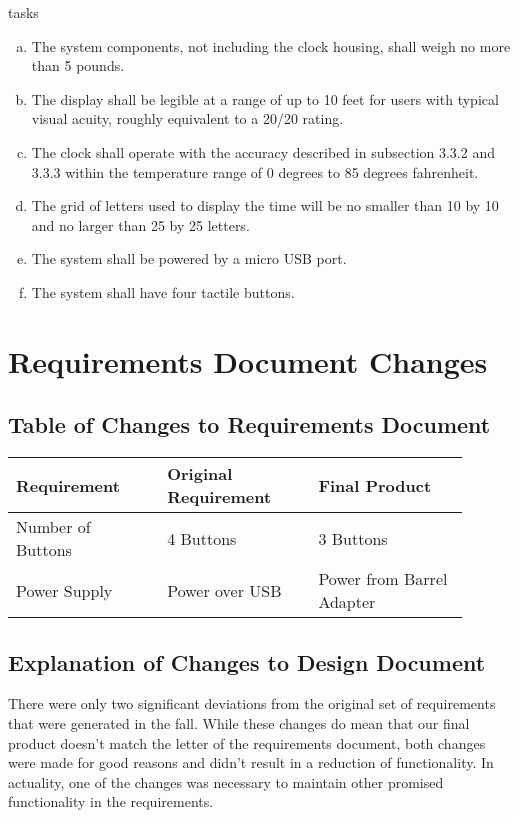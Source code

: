 tasks\documentclass[onecolumn, draftclsnofoot,10pt, compsoc]{IEEEtran}
\begin{document}
\begin{enumerate}[a)]
  \item The system components, not including the clock housing, shall weigh no
  more than 5 pounds.
  \item The display shall be legible at a range of up to 10 feet for users with
  typical visual acuity, roughly equivalent to a 20/20 rating.
  \item The clock shall operate with the accuracy described in subsection 3.3.2 and
  3.3.3 within the temperature range of 0 degrees to 85 degrees fahrenheit.
  \item The grid of letters used to display the time will be no smaller than 10
  by 10 and no larger than 25 by 25 letters.
  \item The system shall be powered by a micro USB port.
  \item The system shall have four tactile buttons.
\end{enumerate}

\section{Requirements Document Changes}

\subsection{Table of Changes to Requirements Document}
\begin{center}
\begin{tabular}{| p{0.3\linewidth} | p{0.3\linewidth} | p{0.3\linewidth} |}
\hline
Requirement &
Original Requirement &
Final Product \\
\hline
Number of Buttons &
4 Buttons &
3 Buttons \\
\hline
Power Supply &
Power over USB &
Power from Barrel Adapter \\
\hline

\end{tabular}
\end{center}

\subsection{Explanation of Changes to Design Document}
There were only two significant deviations from the original set of requirements that were generated in the fall. While these changes do mean that our final product doesn’t match the letter of the requirements document, both changes were made for good reasons and didn’t result in a reduction of functionality. In actuality, one of the changes was necessary to maintain other promised functionality in the requirements.
\end{document}
